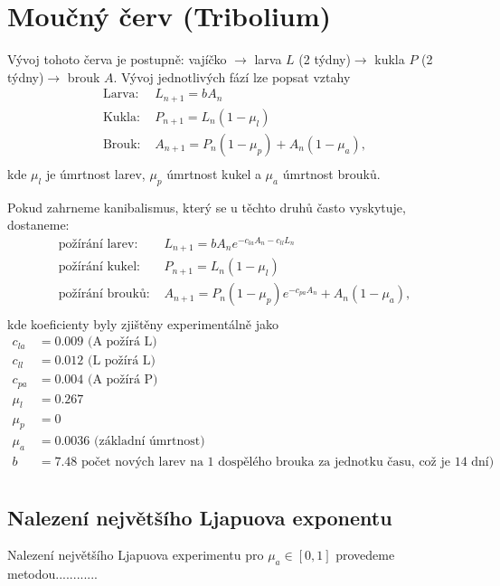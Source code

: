 \documentclass[a4paper, 12pt]{article}
\begin{document}
\section{Moučný červ (Tribolium)}
Vývoj tohoto červa je postupně: vajíčko $\rightarrow$ larva $L$ (2 týdny)$\rightarrow$ kukla $P$ (2 týdny)$\rightarrow$ brouk $A$. Vývoj jednotlivých fází lze popsat vztahy\\
\begin{equation}
    \begin{split}
\text{Larva: }& L_{n+1}=b A_n \\
\text{Kukla: }& P_{n+1}=L_n(1-\mu_l) \\
\text{Brouk: }& A_{n+1}=P_n(1-\mu_p)+A_n(1-\mu_a), \\
    \end{split}
\end{equation}
kde $\mu_l$ je úmrtnost larev, $\mu_p$ úmrtnost kukel a $\mu_a$ úmrtnost brouků.


Pokud zahrneme kanibalismus, který se u těchto druhů často vyskytuje, dostaneme: \\
\begin{equation}
\begin{split}
\text{požírání larev: }&L_{n+1}=b A_n e^{-c_{la}A_n-c_{ll} L_n} \\
\text{požírání kukel: }&P_{n+1}=L_n(1-\mu_l) \\
\text{požírání brouků: }& A_{n+1}=P_n(1-\mu_p)e^{-c_{pa} A_n}+A_n(1-\mu_a), \\
\end{split}
\end{equation}
kde koeficienty byly zjištěny experimentálně jako
\begin{equation}
\begin{split}
c_{la}& = 0.009 \text{ (A požírá L)}\\
c_{ll}& = 0.012 \text{ (L požírá L)}\\
c_{pa}& = 0.004 \text{ (A požírá P)}\\
\mu_l& = 0.267 \\
\mu_p& = 0\\
\mu_a& = 0.0036 \text{ (základní úmrtnost)} \\
b& =7.48 \text{ počet nových larev na 1 dospělého brouka za jednotku času, což je 14 dní)}\\
\end{split}
\end{equation}

\subsection{Nalezení největšího Ljapuova exponentu}
Nalezení největšího Ljapuova experimentu pro $\mu_a\in[0,1]$ provedeme metodou............
\end{document}
